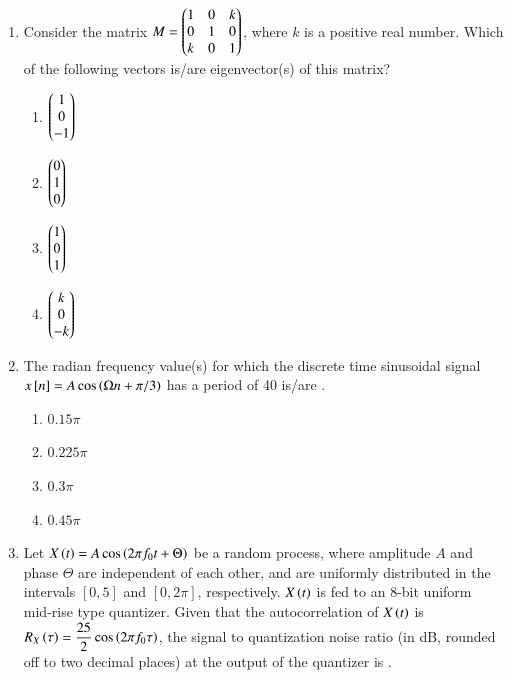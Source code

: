 \documentclass[journal,12pt,onecolumn]{IEEEtran}
\theoremstyle{remark}
\begin{document}
\begin{enumerate}
\item Consider the matrix $M = \begin{pmatrix}1 & 0 & k \\ 0 & 1 & 0 \\ k & 0 & 1\end{pmatrix}$, where $k$ is a positive real number. Which of the following vectors is/are eigenvector(s) of this matrix?
\hfill{}
\begin{multicols}{4}
\begin{enumerate}
    \item $\begin{pmatrix}1 \\ 0 \\ -1\end{pmatrix}$
    \item $\begin{pmatrix}0 \\ 1 \\ 0\end{pmatrix}$
    \item $\begin{pmatrix}1 \\ 0 \\ 1\end{pmatrix}$
    \item $\begin{pmatrix}k \\ 0 \\ -k\end{pmatrix}$
\end{enumerate}
\end{multicols}

\item The radian frequency value(s) for which the discrete time sinusoidal signal $x{}\left[n\right] = A \cos\left(\Omega n + \pi/3\right)$ has a period of 40 is/are \underline{\hspace{2cm}}.

\hfill{}
\begin{multicols}{4}
\begin{enumerate}
    \item $0.15\pi$
    \item $0.225\pi$
    \item $0.3\pi$
    \item $0.45\pi$
\end{enumerate}
\end{multicols}

\item Let $X\left(t\right) = A \cos\left(2\pi f_0 t + \Theta\right)$ be a random process, where amplitude $A$ and phase $\Theta$ are independent of each other, and are uniformly distributed in the intervals $[0, 5]$ and $[0, 2\pi]$, respectively. $X\left(t\right)$ is fed to an 8-bit uniform mid-rise type quantizer. Given that the autocorrelation of $X\left(t\right)$ is $R_X\left(\tau\right) = \dfrac{25}{2}\cos\left(2\pi f_0 \tau\right)$, the signal to quantization noise ratio (in dB, rounded off to two decimal places) at the output of the quantizer is \underline{\hspace{2cm}}.


\end{enumerate}
\end{document}

